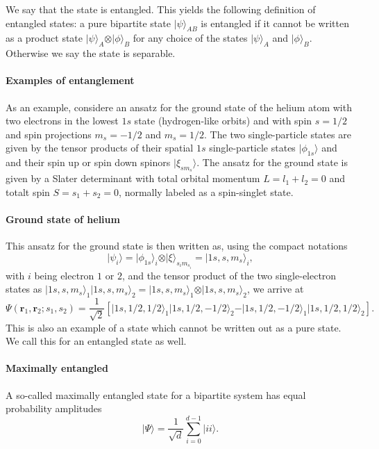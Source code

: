 We say that the state is entangled. This yields the following
definition of entangled states: a pure bipartite state $\vert
\psi\rangle_{AB}$ is entangled if it cannot be written as a product
state $\vert\psi\rangle_{A}\otimes\vert\phi\rangle_B$ for any choice
of the states $\vert\psi\rangle_{A}$ and $\vert\phi\rangle_B$. Otherwise we say the state is separable.


\paragraph{Examples of entanglement}

As an example, considere an ansatz for the ground state of the helium
atom with two electrons in the lowest $1s$ state (hydrogen-like
orbits) and with spin $s=1/2$ and spin projections $m_s=-1/2$ and
$m_s=1/2$.  The two single-particle states are given by the tensor
products of their spatial $1s$ single-particle states
$\vert\phi_{1s}\rangle$ and and their spin up or spin down spinors
$\vert\xi_{sm_s}\rangle$. The ansatz for the ground state is given by a Slater
determinant with total orbital momentum $L=l_1+l_2=0$ and totalt spin
$S=s_1+s_2=0$, normally labeled as a spin-singlet state.


\paragraph{Ground state of helium}
This ansatz
for the ground state is then written as, using the compact notations
\[
\vert \psi_{i}\rangle = \vert\phi_{1s}\rangle_i\otimes \vert \xi\rangle_{s_im_{s_i}}=\vert 1s,s,m_s\rangle_i,  \]
with $i$ being electron $1$ or $2$, and the tensor product of the two single-electron states as
$\vert 1s,s,m_s\rangle_1\vert 1s,s,m_s\rangle_2=\vert 1s,s,m_s\rangle_1\otimes \vert 1s,s,m_s\rangle_2$, we arrive at
\[
\Psi(\bm{r}_1,\bm{r}_2;s_1,s_2)=\frac{1}{\sqrt{2}}\left[\vert 1s,1/2,1/2\rangle_1\vert 1s,1/2,-1/2\rangle_2-\vert 1s,1/2,-1/2\rangle_1\vert 1s,1/2,1/2\rangle_2\right].
\]
This is also an example of a state which cannot be written out as a pure state. We call this for an entangled state as well.


\paragraph{Maximally entangled}

A so-called maximally entangled state for a bipartite system has equal  probability amplitudes
\[
\vert \Psi \rangle = \frac{1}{\sqrt{d}}\sum_{i=0}^{d-1}\vert ii\rangle.
\]

